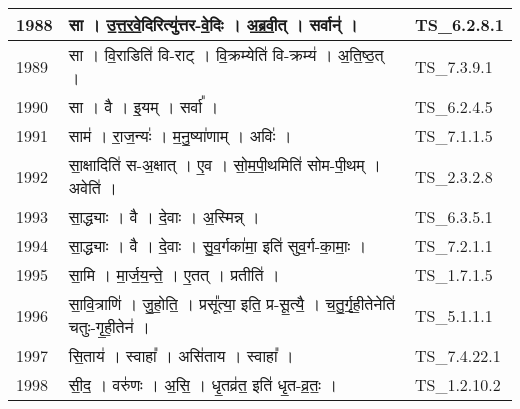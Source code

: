\documentclass[17pt]{extarticle}
\begin{document}
\begin{longtable}{||p{0.4in}||p{4.9in}||p{0.9in}||}
    \hline
        
    1988 & सा   ।   उ॒त्त॒र॒वे॒दिरित्यु॑त्तर{-}वे॒दिः   ।   अ॒ब्र॒वी॒त्   ।   सर्वान्॑   ।    & TS\_6.2.8.1       \\
    
    \hline
        
    1989 & सा   ।   वि॒राडिति॑ वि{-}राट्   ।   वि॒क्रम्येति॑ वि{-}क्रम्य॑   ।   अ॒ति॒ष्ठ॒त्   ।    & TS\_7.3.9.1       \\
    
    \hline
        
    1990 & सा   ।   वै   ।   इ॒यम्   ।   सर्वा᳚   ।    & TS\_6.2.4.5       \\
    
    \hline
        
    1991 & साम॑   ।   रा॒ज॒न्यः॑   ।   म॒नु॒ष्या॑णाम्   ।   अविः॑   ।    & TS\_7.1.1.5       \\
    
    \hline
        
    1992 & सा॒क्षादिति॑ स{-}अ॒क्षात्   ।   ए॒व   ।   सो॒म॒पी॒थमिति॑ सोम{-}पी॒थम्   ।   अवेति॑   ।    & TS\_2.3.2.8       \\
    
    \hline
        
    1993 & सा॒द्ध्याः   ।   वै   ।   दे॒वाः   ।   अ॒स्मिन्न्   ।    & TS\_6.3.5.1       \\
    
    \hline
        
    1994 & सा॒द्ध्याः   ।   वै   ।   दे॒वाः   ।   सु॒व॒र्गका॑मा॒ इति॑ सुव॒र्ग{-}का॒माः॒   ।    & TS\_7.2.1.1       \\
    
    \hline
        
    1995 & सा॒मि   ।   मा॒र्ज॒य॒न्ते॒   ।   ए॒तत्   ।   प्रतीति॑   ।    & TS\_1.7.1.5       \\
    
    \hline
        
    1996 & सा॒वि॒त्राणि॑   ।   जु॒हो॒ति॒   ।   प्रसू᳚त्या॒ इति॒ प्र{-}सू॒त्यै॒   ।   च॒तु॒र्गृ॒ही॒तेनेति॑ चतुः{-}गृ॒ही॒तेन॑   ।    & TS\_5.1.1.1       \\
    
    \hline
        
    1997 & सि॒ताय॑   ।   स्वाहा᳚   ।   असि॑ताय   ।   स्वाहा᳚   ।    & TS\_7.4.22.1       \\
    
    \hline
        
    1998 & सी॒द॒   ।   वरु॑णः   ।   अ॒सि॒   ।   धृ॒तव्र॑त॒ इति॑ धृ॒त{-}व्र॒तः॒   ।    & TS\_1.2.10.2       \\
    

\end{longtable}
\end{document}
